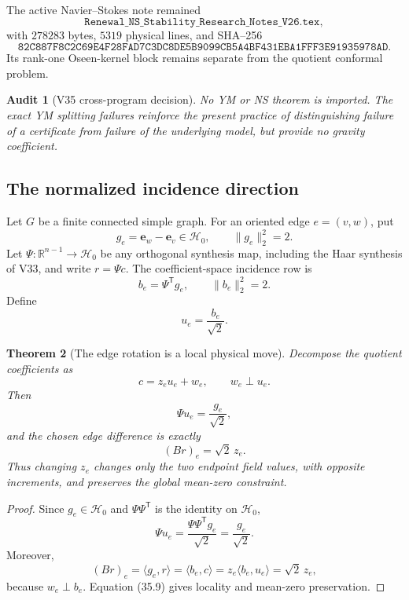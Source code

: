 \documentclass[11pt]{article}
\newtheorem{theorem}{Theorem}[section]
\newtheorem{audit}[theorem]{Audit}
\theoremstyle{remark}
\begin{document}
The active Navier--Stokes note remained
\[
 \texttt{Renewal\_NS\_Stability\_Research\_Notes\_V26.tex},     \tag{35.3}
\]
with \(278283\) bytes, \(5319\) physical lines, and SHA--256
\[
 \texttt{82C887F8C2C69E4F28FAD7C3DC8DE5B9099CB5A4BF431EBA1FFF3E91935978AD}.
                                                               \tag{35.4}
\]
Its rank-one Oseen-kernel block remains separate from the quotient
conformal problem.

\begin{audit}[V35 cross-program decision]
\label{aud:v17v35-companions}
No YM or NS theorem is imported.  The exact YM splitting failures
reinforce the present practice of distinguishing failure of a
certificate from failure of the underlying model, but provide no
gravity coefficient.
\end{audit}

\subsection{The normalized incidence direction}

Let \(G\) be a finite connected simple graph.  For an oriented edge
\(e=(v,w)\), put
\[
 g_e=\mathbf e_w-\mathbf e_v\in\mathcal H_0,
 \qquad \|g_e\|_2^2=2.                             \tag{35.5}
\]
Let \(\Psi:\mathbb R^{n-1}\to\mathcal H_0\) be any orthogonal
synthesis map, including the Haar synthesis of V33, and write
\(r=\Psi c\).  The coefficient-space incidence row is
\[
 b_e=\Psi^{\mathsf T}g_e,\qquad \|b_e\|_2^2=2.     \tag{35.6}
\]
Define
\[
 u_e=\frac{b_e}{\sqrt2}.                            \tag{35.7}
\]

\begin{theorem}[The edge rotation is a local physical move]
\label{thm:v17v35-local}
Decompose the quotient coefficients as
\[
 c=z_eu_e+w_e,\qquad w_e\perp u_e.                 \tag{35.8}
\]
Then
\[
 \Psi u_e=\frac{g_e}{\sqrt2},                     \tag{35.9}
\]
and the chosen edge difference is exactly
\[
 (Br)_e=\sqrt2\,z_e.                               \tag{35.10}
\]
Thus changing \(z_e\) changes only the two endpoint field values,
with opposite increments, and preserves the global mean-zero
constraint.
\end{theorem}

\begin{proof}
Since \(g_e\in\mathcal H_0\) and \(\Psi\Psi^{\mathsf T}\) is the
identity on \(\mathcal H_0\),
\[
 \Psi u_e
 =\frac{\Psi\Psi^{\mathsf T}g_e}{\sqrt2}
 =\frac{g_e}{\sqrt2}.                              \tag{35.11}
\]
Moreover,
\[
 (Br)_e=\langle g_e,r\rangle
 =\langle b_e,c\rangle
 =z_e\langle b_e,u_e\rangle
 =\sqrt2\,z_e,                                     \tag{35.12}
\]
because \(w_e\perp b_e\).  Equation (35.9) gives locality and mean-zero
preservation.
\end{proof}
\end{document}
